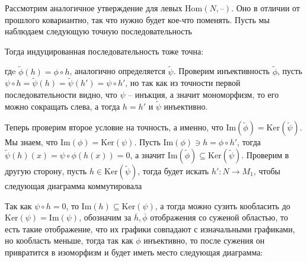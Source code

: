 \documentclass{article}
\begin{document}
\begin{enumerate}
        Рассмотрим аналогичное утверждение для левых $\text{Hom}(N,–)$. Оно в отличии от прошлого ковариантно, 
        так что нужно будет кое-что поменять. Пусть мы наблюдаем следующую точную последовательность
        \begin{center}\end{center}
        Тогда индуцированная последовательность тоже точна:
        \begin{center}\end{center}
        гдe $\widetilde\phi(h)=\phi\circ h$, аналогично определяется $\widetilde\psi$. Проверим инъективность
        $\widetilde\phi$, пусть $\psi\circ h=\widetilde\psi(h)=\widetilde\psi(h')=\psi\circ h'$, но так как
        из точности первой последовательности видно, что $\psi$ – инъкция, а значит мономорфизм, то
        его можно сокращать слева, а тогда $h=h'$ и $\widetilde\psi$ инъективно.

        Теперь проверим второе условие на точность, а именно, что $\text{Im}(\widetilde\phi)=\text{Ker}(\widetilde\psi)$.
        Мы знаем, что $\text{Im}(\phi)=\text{Ker}(\psi)$. Пусть $\text{Im}(\phi)\ni h=\phi\circ h'$,
        тогда $\widetilde\psi(h)(x)=\psi\circ\phi(h(x))=0$, а значит $\text{Im}(\widetilde\phi)\subseteq
        \text{Ker}(\widetilde\psi)$. Проверим в другую сторону, пусть $h\in\text{Ker}(\widetilde\psi)$,
        тогда будет искать $h':N\rightarrow M_1$, чтобы следующая диаграмма коммутировала
        \begin{center}\end{center}
        Так как $\psi\circ h = 0$, то $\text{Im}(h)\subseteq\text{Ker}(\psi)$,
        а тогда можно сузить кообласить до $\text{Ker}(\psi)=\text{Im}(\psi)$,
        обозначим за $\overline h,\overline \phi$ отображения со суженой областью,
        то есть такие отображение, что их графики совпадают с изначальными графиками,
        но кообласть меньше, тогда так как $\phi$ инъективно, то после сужения он
        привратится в изоморфизм и будет иметь место следующая диаграмма:
        \begin{center}\end{center}


\end{enumerate}
\end{document}
